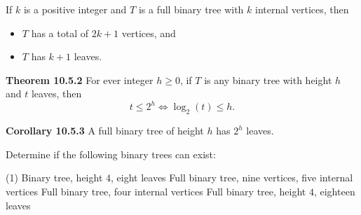 \documentclass[../mathNotesPreamble]{subfiles}
\begin{document}

  \begin{thmBox*}[Theorem 10.5.1]
    If $k$ is a positive integer and $T$ is a full binary tree with $k$ internal vertices, then
    \begin{itemize}
      \item $T$ has a total of $2k+1$ vertices, and
      \item $T$ has $k+1$ leaves.
    \end{itemize}

    \textbf{Theorem 10.5.2}\newline
    For ever integer $h\geq 0$, if $T$ is any binary tree with height $h$ and $t$ leaves, then
      \[t\leq 2^h \Leftrightarrow \log_2(t)\leq h.\]

    \textbf{Corollary 10.5.3}\newline
    A full binary tree of height $h$ has $2^h$ leaves.
  \end{thmBox*}
  \begin{ex*}
    Determine if the following binary trees can exist:
    \begin{extasks}[after-item-skip=\stretch{1}](1)
      \task %
        Binary tree, height $4$, eight leaves
      \task %
        Full binary tree, nine vertices, five internal vertices
      \task %
        Full binary tree, four internal vertices
      \task %
        Full binary tree, height $4$, eighteen leaves
    \end{extasks}
  \end{ex*}
  \pagebreak
\end{document}
